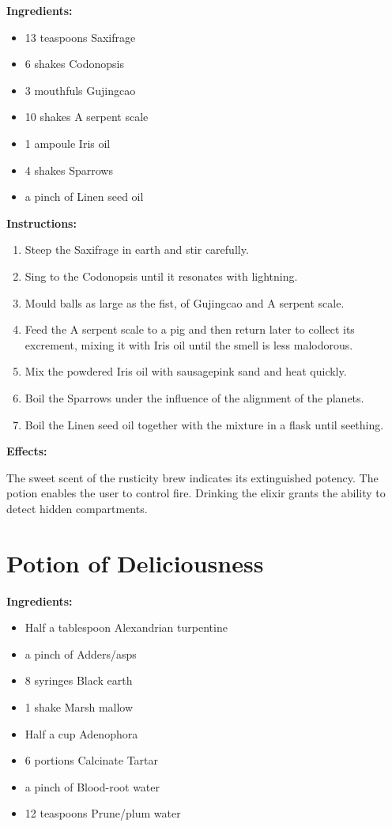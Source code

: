 \documentclass{article}
\begin{document}
\textbf{Ingredients:}

\begin{itemize}
  \item 13 teaspoons Saxifrage
  \item 6 shakes Codonopsis
  \item 3 mouthfuls Gujingcao
  \item 10 shakes A serpent scale
  \item 1 ampoule Iris oil
  \item 4 shakes Sparrows
  \item a pinch of Linen seed oil
\end{itemize}

\textbf{Instructions:}

\begin{enumerate}
  \item Steep the Saxifrage in earth and stir carefully.
  \item Sing to the Codonopsis until it resonates with lightning.
  \item Mould balls as large as the fist, of Gujingcao and A serpent scale.
  \item Feed the A serpent scale to a pig and then return later to collect its excrement, mixing it with Iris oil until the smell is less malodorous.
  \item Mix the powdered Iris oil with sausagepink sand and heat quickly.
  \item Boil the Sparrows under the influence of the alignment of the planets.
  \item Boil the Linen seed oil together with the mixture in a flask until seething.
\end{enumerate}

\textbf{Effects:}

The sweet scent of the rusticity brew indicates its extinguished potency. The potion enables the user to control fire. Drinking the elixir grants the ability to detect hidden compartments.

\newpage
\section*{Potion of Deliciousness}

\textbf{Ingredients:}

\begin{itemize}
  \item Half a tablespoon Alexandrian turpentine
  \item a pinch of Adders/asps
  \item 8 syringes Black earth
  \item 1 shake Marsh mallow
  \item Half a cup Adenophora
  \item 6 portions Calcinate Tartar
  \item a pinch of Blood-root water
  \item 12 teaspoons Prune/plum water
\end{itemize}
\end{document}
